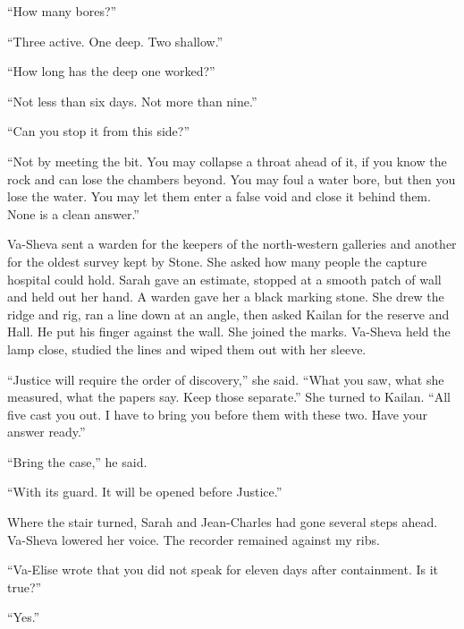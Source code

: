 ``How many bores?''\par

``Three active. One deep. Two shallow.''\par

``How long has the deep one worked?''\par

``Not less than six days. Not more than nine.''\par

``Can you stop it from this side?''\par

``Not by meeting the bit. You may collapse a throat ahead of it, if you know the rock and can lose the chambers beyond. You may foul a water bore, but then you lose the water. You may let them enter a false void and close it behind them. None is a clean answer.''\par

Va-Sheva sent a warden for the keepers of the north-western galleries and another for the oldest survey kept by Stone. She asked how many people the capture hospital could hold. Sarah gave an estimate, stopped at a smooth patch of wall and held out her hand. A warden gave her a black marking stone. She drew the ridge and rig, ran a line down at an angle, then asked Kailan for the reserve and Hall. He put his finger against the wall. She joined the marks. Va-Sheva held the lamp close, studied the lines and wiped them out with her sleeve.\par

``Justice will require the order of discovery,'' she said. ``What you saw, what she measured, what the papers say. Keep those separate.'' She turned to Kailan. ``All five cast you out. I have to bring you before them with these two. Have your answer ready.''\par

``Bring the case,'' he said.\par

``With its guard. It will be opened before Justice.''\par

Where the stair turned, Sarah and Jean-Charles had gone several steps ahead. Va-Sheva lowered her voice. The recorder remained against my ribs.\par

``Va-Elise wrote that you did not speak for eleven days after containment. Is it true?''\par

``Yes.''\par

